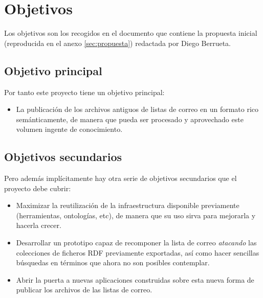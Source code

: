 
\section{Objetivos}

Los objetivos son los recogidos en el documento que contiene la propuesta 
inicial (reproducida en el anexo \ref{sec:propuesta}) redactada por Diego 
Berrueta.

\subsection{Objetivo principal}

Por tanto este proyecto tiene un objetivo principal:

\begin{itemize}
  \item La publicación de los archivos antiguos de listas de correo en un 
	formato rico semánticamente, de manera que pueda ser procesado y
	aprovechado este volumen ingente de conocimiento.
\end{itemize}

\subsection{Objetivos secundarios}

Pero además implícitamente hay otra serie de objetivos secundarios que el
proyecto debe cubrir:

\begin{itemize}
  \item Maximizar la reutilización de la infraestructura disponible previamente
	(herramientas, ontologías, etc), de manera que su uso sirva para mejorarla
	y hacerla crecer.
  \item Desarrollar un prototipo capaz de recomponer la lista de correo 
	\emph{atacando} las colecciones de ficheros RDF previamente exportadas,
	así como hacer sencillas búsquedas en términos que ahora no son
	posibles contemplar.
  \item Abrir la puerta a nuevas aplicaciones construidas sobre esta nueva forma
	de publicar los archivos de las listas de correo.
\end{itemize}

